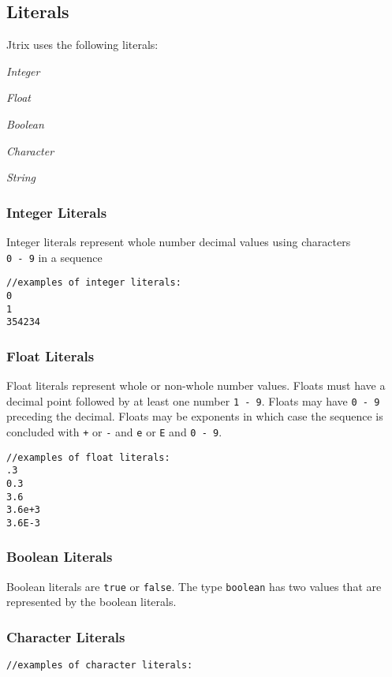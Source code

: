 \documentclass[12pt]{report}
\begin{document}
\subsection{Literals}
Jtrix uses the following literals:

 \textit{Integer}

 \textit{Float}

 \textit{Boolean}

 \textit{Character}

 \textit{String}

\subsubsection{Integer Literals}
Integer literals represent whole number decimal values using characters \\ \texttt{0 - 9} in a sequence
\begin{lstlisting}
//examples of integer literals:
0
1
354234
\end{lstlisting}

\subsubsection{Float Literals}
Float literals represent whole or non-whole number values. Floats must have a decimal point followed by at least one number \texttt{1 - 9}. Floats may have \texttt{0 - 9} preceding the decimal. Floats may be exponents in which case the sequence is concluded with \texttt{+} or \texttt{-} and \texttt{e} or \texttt{E}  and \texttt{0 - 9}.
\begin{lstlisting}
//examples of float literals:
.3
0.3
3.6
3.6e+3
3.6E-3
\end{lstlisting}

\subsubsection{Boolean Literals}
Boolean literals are \texttt{true} or \texttt{false}. The type \texttt{boolean} has two values that are represented by the boolean literals.

\subsubsection{Character Literals}
\begin{lstlisting}
//examples of character literals:

\end{lstlisting}
\end{document}

